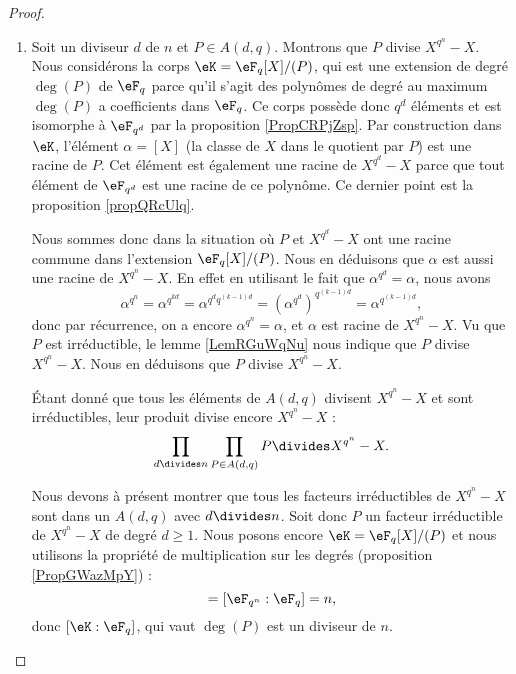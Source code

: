 \begin{proof}
    \begin{enumerate}
        \item
            Soit un diviseur \( d\) de \( n\) et \( P\in A(d,q)\). Montrons que \( P\) divise \( X^{q^n}-X\). Nous considérons la corps \( \eK=\eF_q[X]/(P)\), qui est une extension de degré \( \deg(P)\) de \( \eF_q\) parce qu'il s'agit des polynômes de degré au maximum \( \deg(P)\) a coefficients dans \( \eF_q\). Ce corps possède donc \( q^d\) éléments et est isomorphe à \( \eF_{q^d}\) par la proposition \ref{PropCRPjZsp}. Par construction dans \( \eK\), l'élément \( \alpha=[X]\) (la classe de \( X\) dans le quotient par \( P\)) est une racine de \( P\). Cet élément est également une racine de \( X^{q^d}-X\) parce que tout élément de \( \eF_{q^d}\) est une racine de ce polynôme. Ce dernier point est la proposition \ref{propQRcUlq}.

            Nous sommes donc dans la situation où \( P\) et \( X^{q^d}-X\) ont une racine commune dans l'extension \( \eF_q[X]/(P)\). Nous en déduisons que \( \alpha\) est aussi une racine de \( X^{q^n}-X\). En effet en utilisant le fait que \( \alpha^{q^d}=\alpha\), nous avons
            \begin{equation}
                \alpha^{q^n}=\alpha^{q^{kd}}=\alpha^{q^dq^{(k-1)d}}=\left( \alpha^{q^d} \right)^{q^{(k-1)d}}=\alpha^{q^{(k-1)d}},
            \end{equation}
            donc par récurrence, on a encore \( \alpha^{q^n}=\alpha\), et \( \alpha\) est racine de \( X^{q^n}-X\). Vu que \( P\) est irréductible, le lemme \ref{LemRGuWqNu} nous indique que \( P\) divise \( X^{q^n}-X\). Nous en déduisons que \( P\) divise \( X^{q^n}-X\).

            Étant donné que tous les éléments de \( A(d,q)\) divisent \( X^{q^n}-X\) et sont irréductibles, leur produit divise encore \( X^{q^n}-X\) :
            \begin{equation}
                \prod_{d\divides n}\prod_{P\in A(d,q)}P\divides X^{q^n}-X.
            \end{equation}
            
            Nous devons à présent montrer que tous les facteurs irréductibles de \( X^{q^n}-X\) sont dans un \( A(d,q)\) avec \( d\divides n\). Soit donc \( P\) un facteur irréductible de \( X^{q^n}-X\) de degré \( d\geq 1\). Nous posons encore \( \eK=\eF_q[X]/(P)\) et nous utilisons la propriété de multiplication sur les degrés (proposition \ref{PropGWazMpY}) :
            \begin{equation}
                [\eF_{q^n}:\eK][\eK:\eF_q]=[\eF_{q^n}:\eF_q]=n,
            \end{equation}
            donc \( [\eK:\eF_q]\), qui vaut \( \deg(P)\) est un diviseur de \( n\).


\end{enumerate}
\end{proof}
